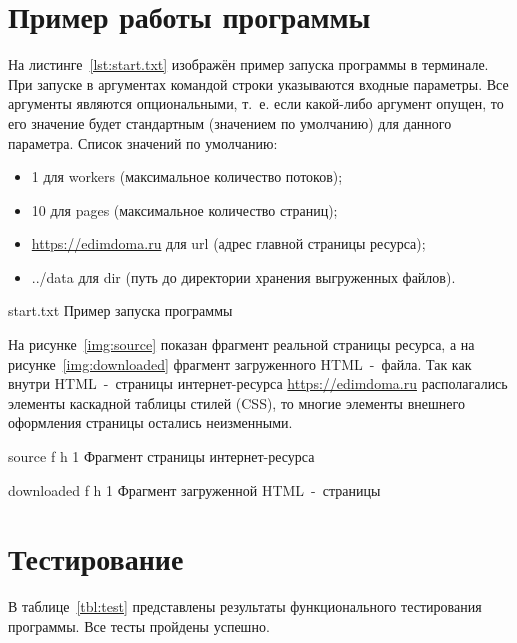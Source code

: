 \chapter{Пример работы программы}

На листинге~\ref{lst:start.txt} изображён пример запуска программы в терминале. При запуске в аргументах командой строки указываются входные параметры. Все аргументы являются опциональными, т.~е. если какой-либо аргумент опущен, то его значение будет стандартным (значением по умолчанию) для данного параметра. Список значений по умолчанию:

\begin{itemize}[label=--]
    \item 1 для workers (максимальное количество потоков);
    \item 10 для pages (максимальное количество страниц);
    \item \url{https://edimdoma.ru} для url (адрес главной страницы ресурса);
    \item ../data для dir (путь до директории хранения выгруженных файлов).
\end{itemize}

{start.txt}
{Пример запуска программы}

На рисунке~\ref{img:source} показан фрагмент реальной страницы ресурса, а на рисунке~\ref{img:downloaded} фрагмент загруженного HTML~-~файла. Так как внутри HTML~-~страницы интернет-ресурса \url{https://edimdoma.ru} располагались элементы каскадной таблицы стилей (CSS), то многие элементы внешнего оформления страницы остались неизменными.

{source}
{f}
{h}
{1 \textwidth}
{Фрагмент страницы интернет-ресурса}

{downloaded}
{f}
{h}
{1 \textwidth}
{Фрагмент загруженной HTML~-~страницы}

\clearpage

\chapter{Тестирование}

В таблице~\ref{tbl:test} представлены результаты функционального тестирования программы. Все тесты пройдены успешно.

